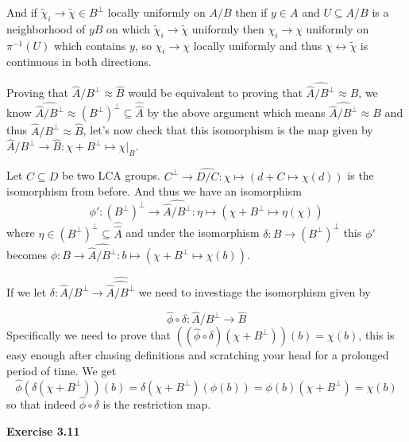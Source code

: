 \documentclass{article}
\begin{document}
\vspace{0.3cm}

And if $\tilde \chi_i \rightarrow \tilde \chi \in B^\perp$ locally uniformly on $A/B$ then if $y \in A$ and $U \subseteq A/B$ is a neighborhood of $yB$ on which $\tilde \chi_i \rightarrow \tilde \chi$ uniformly  then $\chi_i \rightarrow \chi$ uniformly on $\pi^{-1}(U)$ which contains $y$, so $\chi_i \rightarrow \chi$ locally uniformly and thus $\chi \longleftrightarrow \tilde \chi$ is continuous in both directions.

\vspace{0.3cm}

Proving that $\widehat A/B^\perp \approx \widehat B$ would be equivalent to proving that $\widehat{\widehat A/B^\perp} \approx B$, we know $\widehat{\widehat A/B^\perp}\approx (B^\perp)^\perp \subseteq \widehat{\widehat A}$ by the above argument which means $\widehat{\widehat A/B^\perp}\approx B$ and thus $\widehat A/B^\perp \approx \widehat B$, let's now check that this isomorphism is the map given by $\widehat A/B^\perp \rightarrow \widehat B:\chi + B^\perp \mapsto \chi|_B$.

\vspace{0.3cm}
Let $C \subseteq D$ be two LCA groups. $C^\perp \rightarrow \widehat{D/C}:\chi \mapsto (d + C \mapsto \chi(d))$ is the isomorphism from before. And thus we have an isomorphism
$$\phi' : (B^\perp)^\perp \rightarrow \widehat{\widehat A/B^\perp}: \eta \mapsto (\chi + B^\perp \mapsto \eta(\chi))$$ 
where $\eta \in (B^\perp)^\perp \subseteq \widehat{\widehat A}$ and under the isomorphism $\delta : B \rightarrow (B^\perp)^\perp$ this $\phi'$ becomes $\phi : B \rightarrow \widehat{\widehat A/B^\perp} : b \mapsto (\chi + B^{\perp} \mapsto \chi(b))$. 

If we let $\delta : \widehat A/B^\perp \rightarrow \widehat{\widehat{\widehat A/B^\perp}}$ we need to investiage the isomorphism given by

$$\widehat \phi \circ \delta: \widehat A/B^\perp \rightarrow \widehat B$$
Specifically we need to prove that $((\widehat \phi \circ \delta)(\chi+ B^\perp))(b) = \chi(b)$, this is easy enough after chasing definitions and scratching your head for a prolonged period of time. We get 
$$\widehat \phi(\delta(\chi+ B^\perp))(b) = \delta(\chi+ B^\perp)(\phi(b)) = \phi(b)(\chi + B^\perp) = \chi(b)$$ so that indeed $\widehat \phi \circ \delta$ is the restriction map.

\vspace{0.5cm}

\textbf{Exercise 3.11}
\end{document}
